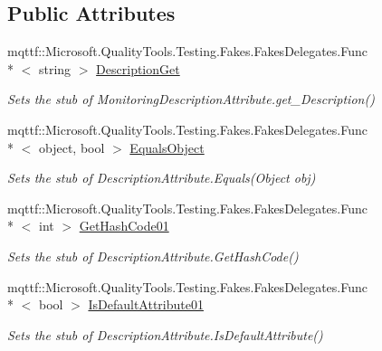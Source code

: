 \subsection*{Public Attributes}
\begin{DoxyCompactItemize}
\item 
mqttf\-::\-Microsoft.\-Quality\-Tools.\-Testing.\-Fakes.\-Fakes\-Delegates.\-Func\\*
$<$ string $>$ \hyperlink{class_system_1_1_diagnostics_1_1_fakes_1_1_stub_monitoring_description_attribute_a82ac717e1c43bbddf59a9fb80b7b77a3}{Description\-Get}
\begin{DoxyCompactList}\small\item\em Sets the stub of Monitoring\-Description\-Attribute.\-get\-\_\-\-Description()\end{DoxyCompactList}\item 
mqttf\-::\-Microsoft.\-Quality\-Tools.\-Testing.\-Fakes.\-Fakes\-Delegates.\-Func\\*
$<$ object, bool $>$ \hyperlink{class_system_1_1_diagnostics_1_1_fakes_1_1_stub_monitoring_description_attribute_a7f20a38d7cc683c361f771885b0d238d}{Equals\-Object}
\begin{DoxyCompactList}\small\item\em Sets the stub of Description\-Attribute.\-Equals(\-Object obj)\end{DoxyCompactList}\item 
mqttf\-::\-Microsoft.\-Quality\-Tools.\-Testing.\-Fakes.\-Fakes\-Delegates.\-Func\\*
$<$ int $>$ \hyperlink{class_system_1_1_diagnostics_1_1_fakes_1_1_stub_monitoring_description_attribute_a243f86e7617f4e297438e06844409f35}{Get\-Hash\-Code01}
\begin{DoxyCompactList}\small\item\em Sets the stub of Description\-Attribute.\-Get\-Hash\-Code()\end{DoxyCompactList}\item 
mqttf\-::\-Microsoft.\-Quality\-Tools.\-Testing.\-Fakes.\-Fakes\-Delegates.\-Func\\*
$<$ bool $>$ \hyperlink{class_system_1_1_diagnostics_1_1_fakes_1_1_stub_monitoring_description_attribute_ac2aff0bfbc5a7cc3314ec87034d3722d}{Is\-Default\-Attribute01}
\begin{DoxyCompactList}\small\item\em Sets the stub of Description\-Attribute.\-Is\-Default\-Attribute()\end{DoxyCompactList}\item 

\end{DoxyCompactItemize}
